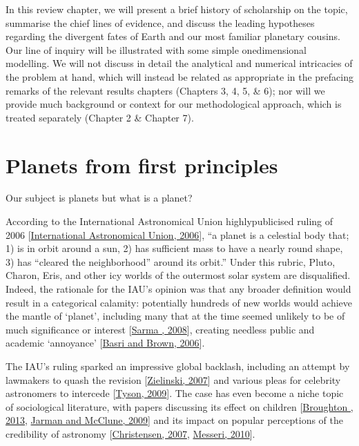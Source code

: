 \documentclass[letterpaper,10pt,english]{jupyterBook}
\begin{document}
\sphinxAtStartPar
In this review chapter, we will present a brief history of scholarship on the topic, summarise the chief lines of evidence, and discuss the leading hypotheses regarding the divergent fates of Earth and our most familiar planetary cousins. Our line of inquiry will be illustrated with some simple one\sphinxhyphen{}dimensional modelling. We will not discuss in detail the analytical and numerical intricacies of the problem at hand, which will instead be related as appropriate in the prefacing remarks of the relevant results chapters (Chapters 3, 4, 5, \& 6); nor will we provide much background or context for our methodological approach, which is treated separately (Chapter 2 \& Chapter 7).


\section{Planets from first principles}
\label{\detokenize{content/chapter_01_background/main:planets-from-first-principles}}
\sphinxAtStartPar
Our subject is planets \sphinxhyphen{} but what is a planet?

\sphinxAtStartPar
According to the International Astronomical Union highly\sphinxhyphen{}publicised ruling of 2006 {[}\hyperlink{cite.references:id293}{International Astronomical Union, 2006}{]}, “a planet is a celestial body that; 1) is in orbit around a sun, 2) has sufficient mass to have a nearly round shape, 3) has “cleared the neighborhood” around its orbit.” Under this rubric, Pluto, Charon, Eris, and other icy worlds of the outermost solar system are disqualified. Indeed, the rationale for the IAU’s opinion was that any broader definition would result in a categorical calamity: potentially hundreds of new worlds would achieve the mantle of ‘planet’, including many that at the time seemed unlikely to be of much significance or interest {[}\hyperlink{cite.references:id634}{Sarma , 2008}{]}, creating needless public and academic ‘annoyance’ {[}\hyperlink{cite.references:id640}{Basri and Brown, 2006}{]}.

\sphinxAtStartPar
The IAU’s ruling sparked an impressive global backlash, including an attempt by lawmakers to quash the revision {[}\hyperlink{cite.references:id636}{Zielinski, 2007}{]} and various pleas for celebrity astronomers to intercede {[}\hyperlink{cite.references:id637}{Tyson, 2009}{]}. The case has even become a niche topic of sociological literature, with papers discussing its effect on children {[}\hyperlink{cite.references:id479}{Broughton , 2013}, \hyperlink{cite.references:id632}{Jarman and McClune, 2009}{]} and its impact on popular perceptions of the credibility of astronomy {[}\hyperlink{cite.references:id480}{Christensen, 2007}, \hyperlink{cite.references:id629}{Messeri, 2010}{]}.
\end{document}
